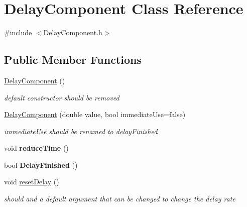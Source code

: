 \hypertarget{class_delay_component}{}\section{Delay\+Component Class Reference}
\label{class_delay_component}


{\ttfamily \#include $<$Delay\+Component.\+h$>$}

\subsection*{Public Member Functions}
\begin{DoxyCompactItemize}
\item 
\mbox{\label{class_delay_component_adcfaeb65d23778a3468156b34140c7f5}} 
\hyperlink{class_delay_component_adcfaeb65d23778a3468156b34140c7f5}{Delay\+Component} ()
\begin{DoxyCompactList}\small\item\em default constructor should be removed \end{DoxyCompactList}\item 
\mbox{\label{class_delay_component_aab69fe25b426b7ac1696840ad1f56c35}} 
\hyperlink{class_delay_component_aab69fe25b426b7ac1696840ad1f56c35}{Delay\+Component} (double value, bool immediate\+Use=false)
\begin{DoxyCompactList}\small\item\em immediate\+Use should be renamed to delay\+Finished \end{DoxyCompactList}\item 
\mbox{\label{class_delay_component_ac2c7023f723523ba2e42ae047d9b6092}} 
void {\bfseries reduce\+Time} ()
\item 
\mbox{\label{class_delay_component_a8942e663b1a92471ea79f0e7203d30bc}} 
bool {\bfseries Delay\+Finished} ()
\item 
\mbox{\label{class_delay_component_a539b563338fb30932c96f087dd7a0f5b}} 
void \hyperlink{class_delay_component_a539b563338fb30932c96f087dd7a0f5b}{reset\+Delay} ()
\begin{DoxyCompactList}\small\item\em should and a default argument that can be changed to change the delay rate \end{DoxyCompactList}\end{DoxyCompactItemize}


